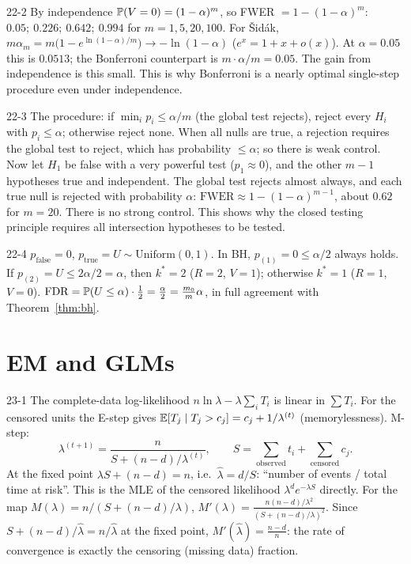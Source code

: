 \begin{solution}{22-2}
By independence $\P(V=0)=(1-\alpha)^m$, so FWER $=1-(1-\alpha)^m$: $0.05;\ 0.226;\ 0.642;\ 0.994$ for $m=1,5,20,100$. For Šidák, $m\alpha_m=m\big(1-e^{\ln(1-\alpha)/m}\big)\to-\ln(1-\alpha)$ ($e^x=1+x+o(x)$). At $\alpha=0.05$ this is $0.0513$; the Bonferroni counterpart is $m\cdot\alpha/m=0.05$. The gain from independence is this small. This is why Bonferroni is a nearly optimal single-step procedure even under independence.
\end{solution}

\begin{solution}{22-3}
The procedure: if $\min_ip_i\le\alpha/m$ (the global test rejects), reject every $H_i$ with $p_i\le\alpha$; otherwise reject none. When all nulls are true, a rejection requires the global test to reject, which has probability $\le\alpha$; so there is weak control. Now let $H_1$ be false with a very powerful test ($p_1\approx0$), and the other $m-1$ hypotheses true and independent. The global test rejects almost always, and each true null is rejected with probability $\alpha$: $\mathrm{FWER}\approx1-(1-\alpha)^{m-1}$, about $0.62$ for $m=20$. There is no strong control. This shows why the closed testing principle requires all intersection hypotheses to be tested.
\end{solution}

\begin{solution}{22-4}
$p_{\text{false}}=0$, $p_{\text{true}}=U\sim\text{Uniform}(0,1)$. In BH, $p_{(1)}=0\le\alpha/2$ always holds. If $p_{(2)}=U\le2\alpha/2=\alpha$, then $k^*=2$ ($R=2$, $V=1$); otherwise $k^*=1$ ($R=1$, $V=0$). $\mathrm{FDR}=\P(U\le\alpha)\cdot\frac12=\frac\alpha2=\frac{m_0}m\alpha$, in full agreement with Theorem~\ref{thm:bh}.
\end{solution}

\section{EM and GLMs}

\begin{solution}{23-1}
The complete-data log-likelihood $n\ln\lambda-\lambda\sum_iT_i$ is linear in $\sum T_i$. For the censored units the E-step gives $\E[T_j\mid T_j>c_j]=c_j+1/\lambda^{(t)}$ (memorylessness). M-step:
\[
\lambda^{(t+1)}=\frac{n}{S+(n-d)/\lambda^{(t)}},\qquad S=\sum_{\text{observed}}t_i+\sum_{\text{censored}}c_j .
\]
At the fixed point $\lambda S+(n-d)=n$, i.e.\ $\hat\lambda=d/S$: ``number of events / total time at risk''. This is the MLE of the censored likelihood $\lambda^de^{-\lambda S}$ directly. For the map $M(\lambda)=n/(S+(n-d)/\lambda)$, $M'(\lambda)=\frac{n(n-d)/\lambda^2}{(S+(n-d)/\lambda)^2}$. Since $S+(n-d)/\hat\lambda=n/\hat\lambda$ at the fixed point, $M'(\hat\lambda)=\frac{n-d}{n}$: the rate of convergence is exactly the censoring (missing data) fraction.
\end{solution}

